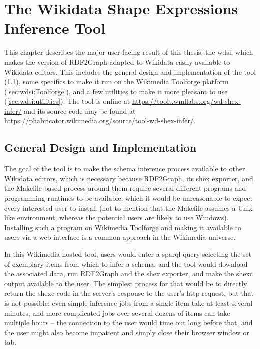 
\chapter{The Wikidata Shape Expressions Inference Tool}
\label{ch:wdsi}

This chapter describes the major user-facing result of this thesis:
the \gls{wdsi},
which makes the version of \gls{RDF2Graph} adapted to \gls{Wikidata}
easily available to \gls{Wikidata} editors.
This includes the general design and implementation of the tool (\cref{sec:wdsi:abstract}),
some specifics to make it run on the Wikimedia Toolforge platform (\cref{sec:wdsi:Toolforge}),
and a few utilities to make it more pleasant to use (\cref{sec:wdsi:utilities}).
The tool is online at \url{https://tools.wmflabs.org/wd-shex-infer/}
and its source code may be found at \url{https://phabricator.wikimedia.org/source/tool-wd-shex-infer/}.

\section{General Design and Implementation}
\label{sec:wdsi:abstract}

The goal of the tool is to make the \gls{schema} inference process available to other \gls{Wikidata} editors,
which is necessary because \gls{RDF2Graph}, its \gls{shex} exporter, and the Makefile-based process around them
require several different programs and programming runtimes to be available,
which it would be unreasonable to expect every interested user to install
(not to mention that the Makefile assumes a Unix-like environment,
whereas the potential users are likely to use Windows).
Installing such a program on Wikimedia Toolforge
and making it available to users via a web interface
is a common approach in the Wikimedia universe.

In this Wikimedia-hosted tool,
users would enter a \gls{sparql} query selecting the set of exemplary \glspl{item} from which to infer a \gls{schema},
and the tool would download the associated data,
run \gls{RDF2Graph} and the \gls{shex} exporter,
and make the \gls{shexc} output available to the user.
The simplest process for that would be
to directly return the \gls{shexc} code in the server’s response to the user’s \gls{http} request,
but that is not possible:
even simple inference \glspl{job}
from a single \gls{item} take at least several minutes,
and more complicated \glspl{job}
over several dozens of \glspl{item} can take multiple hours –
the connection to the user would time out long before that,
and the user might also become impatient and simply close their browser window or tab.

